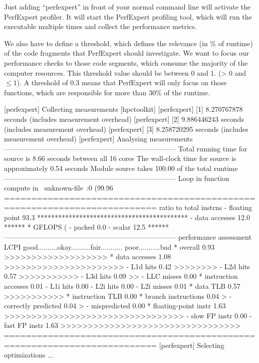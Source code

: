 Just adding ``perfexpert'' in front of your normal command line will activate the PerfExpert profiler.  It will start the PerfExpert profiling tool, which will run the executable multiple times and collect the performance metrics.

We also have to define a threshold, which defines the relevance (in \% of runtime) of the code fragments that PerfExpert should investigate. We want to focus our performance checks to those code segments, which consume the majority of the computer resources.  This threshold value should be between 0 and 1. (> 0 and $\leq 1$).  A threshold of 0.3 means that PerfExpert will only focus on those functions, which are responsible for more than 30\% of the runtime.

\begin{prompt}
[perfexpert] Collecting measurements [hpctoolkit]
[perfexpert]    [1] 8.270767878 seconds (includes measurement overhead)
[perfexpert]    [2] 9.886446243 seconds (includes measurement overhead)
[perfexpert]    [3] 8.258720295 seconds (includes measurement overhead)
[perfexpert] Analysing measurements
--------------------------------------------------------------------------
Total running time for source is 8.66 seconds between all 16 cores
The wall-clock time for source is approximately 0.54 seconds
Module source takes 100.00 of the total runtime
--------------------------------------------------------------------------
Loop in function compute in ~unknown-file~:0 (99.96%
==========================================================================
ratio to total instrns     %
- floating point       93.3 *******************************************
- data accesses        12.0 ******
* GFLOPS (%
- packed                0.0
- scalar               12.5 ******
--------------------------------------------------------------------------
performance assessment LCPI good..........okay..........fair........... poor...........bad
* overall              0.93 >>>>>>>>>>>>>>>>>>>
* data accesses        1.08 >>>>>>>>>>>>>>>>>>>>>>
- L1d hits             0.42 >>>>>>>>
- L2d hits             0.57 >>>>>>>>>>>
- L3d hits             0.09 >>
- LLC misses           0.00
* instruction accesses 0.01
- L1i hits             0.00
- L2i hits             0.00
- L2i misses           0.01
* data TLB             0.57 >>>>>>>>>>>
* instruction TLB      0.00
* branch instructions  0.04 >
- correctly predicted  0.04 >
- mispredicted         0.00
* floating-point instr 1.63 >>>>>>>>>>>>>>>>>>>>>>>>>>>>>>>>>
- slow FP instr        0.00
- fast FP instr        1.63 >>>>>>>>>>>>>>>>>>>>>>>>>>>>>>>>>
==========================================================================
[perfexpert] Selecting optimizations
...
\end{prompt}

